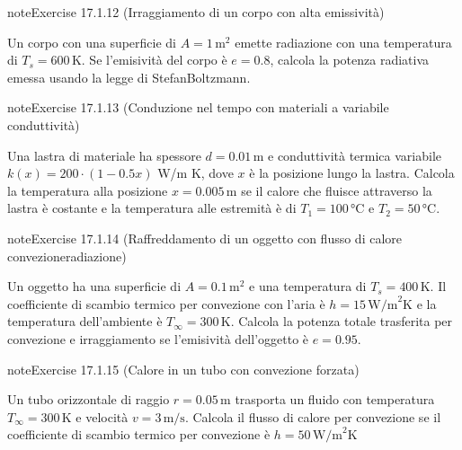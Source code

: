 \documentclass[letterpaper,10pt,italian]{jupyterBook}
\begin{document}
\begin{sphinxadmonition}{note}{Exercise 17.1.12 (Irraggiamento di un corpo con alta emissività)}



\sphinxAtStartPar
Un corpo con una superficie di \(A = 1 \, \text{m}^2\) emette radiazione con una temperatura di \(T_s = 600 \, \text{K}\). Se l’emisività del corpo è \(e = 0.8\), calcola la potenza radiativa emessa usando la legge di Stefan\sphinxhyphen{}Boltzmann.
\end{sphinxadmonition}
 \label{exercise:ch/thermodynamics/heat-transmission-problems-exercise-12}

\begin{sphinxadmonition}{note}{Exercise 17.1.13 (Conduzione nel tempo con materiali a variabile conduttività)}



\sphinxAtStartPar
Una lastra di materiale ha spessore \(d = 0.01 \, \text{m}\) e conduttività termica variabile \(k(x) = 200 \cdot (1 - 0.5x)\) W/m K, dove \(x\) è la posizione lungo la lastra. Calcola la temperatura alla posizione \(x = 0.005 \, \text{m}\) se il calore che fluisce attraverso la lastra è costante e la temperatura alle estremità è di \(T_1 = 100 \, \text{°C}\) e \(T_2 = 50 \, \text{°C}\).
\end{sphinxadmonition}
 \label{exercise:ch/thermodynamics/heat-transmission-problems-exercise-13}

\begin{sphinxadmonition}{note}{Exercise 17.1.14 (Raffreddamento di un oggetto con flusso di calore convezione\sphinxhyphen{}radiazione)}



\sphinxAtStartPar
Un oggetto ha una superficie di \(A = 0.1 \, \text{m}^2\) e una temperatura di \(T_s = 400 \, \text{K}\). Il coefficiente di scambio termico per convezione con l’aria è \(h = 15 \, \text{W/m}^2\text{K}\) e la temperatura dell’ambiente è \(T_\infty = 300 \, \text{K}\). Calcola la potenza totale trasferita per convezione e irraggiamento se l’emisività dell’oggetto è \(e = 0.95\).
\end{sphinxadmonition}
 \label{exercise:ch/thermodynamics/heat-transmission-problems-exercise-14}

\begin{sphinxadmonition}{note}{Exercise 17.1.15 (Calore in un tubo con convezione forzata)}



\sphinxAtStartPar
Un tubo orizzontale di raggio \(r = 0.05 \, \text{m}\) trasporta un fluido con temperatura \(T_\infty = 300 \, \text{K}\) e velocità \(v = 3 \, \text{m/s}\). Calcola il flusso di calore per convezione se il coefficiente di scambio termico per convezione è \(h = 50 \, \text{W/m}^2\text{K}\)
\end{sphinxadmonition}
\end{document}
